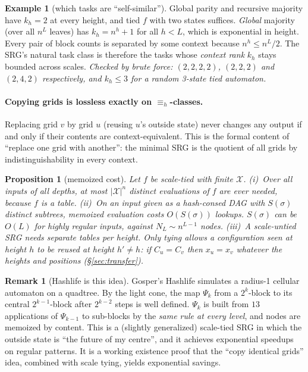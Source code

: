 \documentclass[11pt]{article}
\newtheorem{proposition}[theorem]{Proposition}
\theoremstyle{definition}
\newtheorem{example}[theorem]{Example}
\newtheorem{remark}[theorem]{Remark}
\newcommand{\Nint}{N_{L}}
\newcommand{\cX}{\mathcal{X}}
\begin{document}
\begin{example}[which tasks are ``self-similar'']\label{ex:tasks}
Global parity and recursive majority have $k_h=2$ at every height, and tied $f$ with two states
suffices. \emph{Global} majority (over all $n^L$ leaves) has $k_h=n^h+1$ for all $h<L$, which is
exponential in height. Every pair of block counts is separated by some context because
$n^h\le n^L/2$. The SRG's natural task class is therefore the tasks whose \emph{context rank}
$k_h$ stays bounded across scales. \emph{Checked by brute force: $(2,2,2,2)$, $(2,2,2)$ and
$(2,4,2)$ respectively, and $k_h\le3$ for a random 3-state tied automaton.}
\end{example}

\paragraph{Copying grids is lossless exactly on $\equiv_h$-classes.}
Replacing grid $v$ by grid $u$ (reusing $u$'s outside state) never changes any output if and
only if their contents are context-equivalent. This is the formal content of ``replace one grid
with another'': the minimal SRG is the quotient of all grids by indistinguishability in every
context.

\begin{proposition}[memoized cost]\label{prop:memo}
Let $f$ be scale-tied with finite $\cX$.
(i)~Over \emph{all inputs of all depths}, at most $|\cX|^n$ distinct evaluations of $f$ are ever
needed, because $f$ is a table.
(ii)~On an input given as a hash-consed DAG with $S(\sigma)$ distinct subtrees, memoized
evaluation costs $O(S(\sigma))$ lookups. $S(\sigma)$ can be $O(L)$ for highly regular inputs,
against $\Nint\sim n^{L-1}$ nodes.
(iii)~A scale-untied SRG needs separate tables per height. Only tying allows a configuration
seen at height $h$ to be reused at height $h'\ne h$: if $C_u=C_v$ then $x_u=x_v$ whatever the
heights and positions (\S\ref{sec:transfer}).
\end{proposition}

\begin{remark}[Hashlife is this idea]\label{rem:hashlife}
Gosper's Hashlife \cite{gosper1984} simulates a radius-1 cellular automaton on a quadtree.
By the light cone, the map $\Psi_k$ from a $2^k$-block to its central $2^{k-1}$-block after
$2^{k-2}$ steps is well defined. $\Psi_k$ is built from $13$ applications of $\Psi_{k-1}$ to
sub-blocks by the \emph{same rule at every level}, and nodes are memoized by content. This is a
(slightly generalized) scale-tied SRG in which the outside state is ``the future of my centre'',
and it achieves exponential speedups on regular patterns. It is a working existence proof that
the ``copy identical grids'' idea, combined with scale tying, yields exponential savings.
\end{remark}
\end{document}
